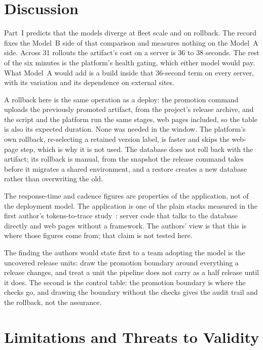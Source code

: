 \documentclass[11pt]{article}
\begin{document}
\section{Discussion}

Part~I predicts that the models diverge at fleet scale and on rollback. The record fixes the Model~B side of that comparison and measures nothing on the Model~A side. Across 31 rollouts the artifact's cost on a server is 36 to 38 seconds. The rest of the six minutes is the platform's health gating, which either model would pay. What Model~A would add is a build inside that 36-second term on every server, with its variation and its dependence on external sites.

A rollback here is the same operation as a deploy: the promotion command uploads the previously promoted artifact, from the project's release archive, and the script and the platform run the same stages, web pages included, so the table is also its expected duration. None was needed in the window. The platform's own rollback, re-selecting a retained version label, is faster and skips the web-page step, which is why it is not used. The database does not roll back with the artifact; its rollback is manual, from the snapshot the release command takes before it migrates a shared environment, and a restore creates a new database rather than overwriting the old.

The response-time and cadence figures are properties of the application, not of the deployment model. The application is one of the plain stacks measured in the first author's tokens-to-trace study~\cite{TokensToTrace}: server code that talks to the database directly and web pages without a framework. The authors' view is that this is where those figures come from; that claim is not tested here.

The finding the authors would state first to a team adopting the model is the uncovered release units: draw the promotion boundary around everything a release changes, and treat a unit the pipeline does not carry as a half release until it does. The second is the control table: the promotion boundary is where the checks go, and drawing the boundary without the checks gives the audit trail and the rollback, not the assurance.

\section{Limitations and Threats to Validity}
\end{document}
